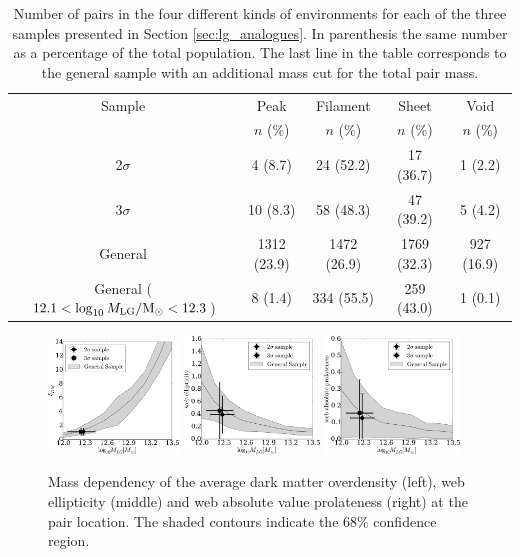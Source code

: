 \documentclass{emulateapj}
\newcommand{\Msun}{{\ifmmode{{\rm {M_{\odot}}}}\else{${\rm{M_{\odot}}}$}\fi}}
\begin{document}
\begin{table}
\begin{center}
\begin{tabular}{ccccc}\hline\hline
Sample & Peak & Filament & Sheet & Void\\
       & $n$ (\%) & $n$ (\%) & $n$ (\%) & $n$ (\%) \\\hline
2$\sigma$ & 4 (8.7) & 24 (52.2) &  17 (36.7) & 1 (2.2)\\
3$\sigma$ & 10 (8.3) & 58 (48.3) & 47 (39.2) & 5 (4.2)\\  
General & 1312 (23.9) & 1472 (26.9) & 1769 (32.3) & 927 (16.9)\\
General ($12.1<\log_{10} M_{\rm LG}/\Msun<12.3$)& 8 (1.4) & 334 (55.5) & 259
(43.0) & 1 (0.1)\\
\hline\hline
\end{tabular}
\caption{
Number of pairs in the four different kinds of environments for each
of the three samples presented in Section \ref{sec:lg_analogues}. 
In parenthesis the same number as a percentage of the total population.
The last line in the table corresponds to the general sample with an
additional mass cut for the total pair mass.  
\label{table:web_type}}
\end{center}
\end{table}




\begin{figure}
\begin{center}
  \includegraphics[width=0.31\textwidth]{fig2a.pdf}
  \includegraphics[width=0.32\textwidth]{fig2b.pdf}
  \includegraphics[width=0.32\textwidth]{fig2c.pdf}
\caption{Mass dependency of the average dark matter overdensity (left),
  web ellipticity (middle) and web absolute value prolateness (right) at the
  pair location. The shaded contours indicate the $68\%$ confidence region. 
\label{fig:median_overdensity}}
\end{center}
\end{figure}
\end{document}
